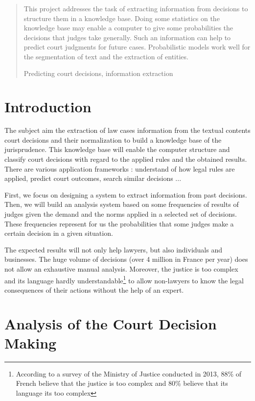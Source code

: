 \documentclass[runningheads,a4paper]{llncs}
\newcommand{\keywords}[1]{\par\addvspace\baselineskip
\noindent\keywordname\enspace\ignorespaces#1}
\begin{document}
\begin{abstract}

This project addresses the task of extracting information from decisions to structure them in a knowledge base. Doing some statistics on the knowledge base may enable a computer to give some probabilities the decisions that judges take generally. Such an information can help to predict court judgments for future cases. Probabilistic models work well for the segmentation of text and the extraction of entities. 

\keywords{Predicting court decisions, information extraction}
\end{abstract}


\section{Introduction}

The subject aim the extraction of law cases information from the textual contents court decisions and their normalization to build a knowledge base of the jurisprudence. This knowledge base will enable the computer structure and classify court decisions with regard to the applied rules and the obtained results. There are various application frameworks : understand of how legal rules are applied, predict court outcomes, search similar decisions ... 

First, we focus on designing a system to extract information from past decisions. Then, we will build an analysis  system based on some frequencies of results of judges given the demand and the norms applied in a selected  set of decisions. These frequencies represent for us the probabilities that some judges make a certain decision in a given situation.

The expected results will not only help lawyers, but also individuals and businesses. The huge volume of decisions (over 4 million in France per year) does not allow an exhaustive manual analysis. Moreover, the justice is too complex and its language hardly understandable\footnote{According to a survey of the Ministry of Justice conducted in 2013, 88\% of French believe that the justice is too complex and 80\% believe that its language its too complex\cite{cretin2014justicecomplexe}} to allow non-lawyers to know the legal consequences of their actions without the help of an expert.

\section{Analysis of the Court Decision Making}
\end{document}
